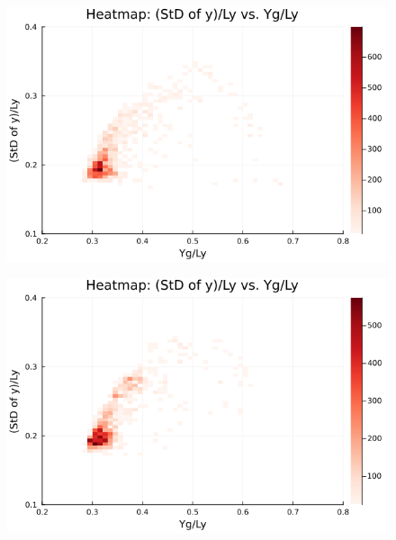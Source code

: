\begin{figure}[H]
  \centering
  \includegraphics[scale=0.6]{image/RaRtmap_heat/2023-11-14T23:48:31.439__chi1.265_Ay50_rho0.4_T0.43_dT0.04_Rd0.0_Rt0.125_Ra0.4693845_g0.0003999718779659611_run4.0e7_output.png}
  \label{}
\end{figure}

\begin{figure}[H]
  \centering
  \includegraphics[scale=0.6]{image/RaRtmap_heat/2023-11-15T00:43:33.781__chi1.265_Ay50_rho0.4_T0.43_dT0.04_Rd0.0_Rt0.125_Ra0.938769_g0.0003999718779659611_run4.0e7_output.png}
  \label{}
\end{figure}

